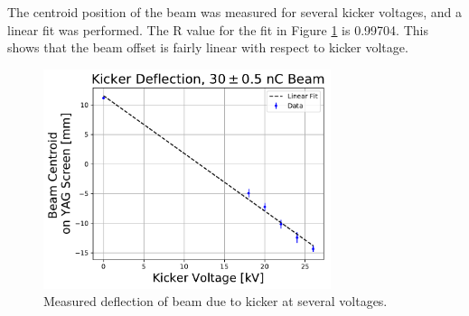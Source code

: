 The centroid position of the beam was measured for several kicker voltages, and a linear fit was performed.
The R value for the fit in Figure \ref{fig:linear} is 0.99704. This shows that the beam offset 
is fairly linear with respect to kicker voltage. 
\begin{figure}
	\centering
	\includegraphics[width=0.75\textwidth]{./images/kicker_linearity}
	\caption{Measured deflection of beam due to kicker at several voltages.}
	\label{fig:linear}
\end{figure}

